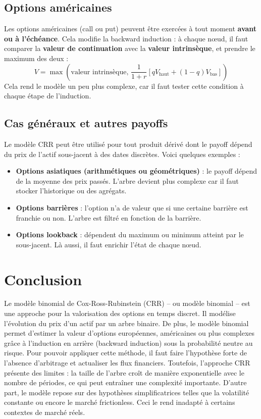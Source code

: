 \documentclass[12pt,a4paper]{article}
\begin{document}
\subsection{Options américaines}
Les options américaines (call ou put) peuvent être exercées à tout moment \textbf{avant ou à l’échéance}. Cela modifie la backward induction : à chaque nœud, il faut comparer la \textbf{valeur de continuation} avec la \textbf{valeur intrinsèque}, et prendre le maximum des deux :
\[
\boxed{V = \max\left( \text{valeur intrinsèque}, \, \frac{1}{1 + r} \left[ q V_\text{haut} + (1 - q) V_\text{bas} \right] \right)}
\]
Cela rend le modèle un peu plus complexe, car il faut tester cette condition à chaque étape de l’induction.

\subsection{Cas généraux et autres payoffs}
Le modèle CRR peut être utilisé pour tout produit dérivé dont le payoff dépend du prix de l’actif sous-jacent à des dates discrètes. Voici quelques exemples :
\begin{itemize}
    \item \textbf{Options asiatiques (arithmétiques ou géométriques)} : le payoff dépend de la moyenne des prix passés. L’arbre devient plus complexe car il faut stocker l’historique ou des agrégats.
    \item \textbf{Options barrières} : l’option n’a de valeur que si une certaine barrière est franchie ou non. L’arbre est filtré en fonction de la barrière.
    \item \textbf{Options lookback} : dépendent du maximum ou minimum atteint par le sous-jacent. Là aussi, il faut enrichir l’état de chaque nœud.
\end{itemize}




\newpage 

\section{Conclusion}

Le modèle binomial de Cox-Ross-Rubinstein (CRR) -- ou modèle binomial -- est une approche pour la valorisation des options en temps discret. Il modélise l’évolution du prix d’un actif par un arbre binaire. De plus, le modèle binomial permet d’estimer la valeur d’options européennes, américaines ou plus complexes grâce à l’induction en arrière (backward induction) sous la probabilité neutre au risque. Pour pouvoir appliquer cette méthode, il faut faire l'hypothèse forte de l'absence d'arbitrage et actualiser les flux financiers. Toutefois, l’approche CRR présente des limites : la taille de l’arbre croît de manière exponentielle avec le nombre de périodes, ce qui peut entraîner une complexité importante. D'autre part, le modèle repose sur des hypothèses simplificatrices telles que la volatilité constante ou encore le marché frictionless. Ceci le rend inadapté à certains contextes de marché réels.
\end{document}
